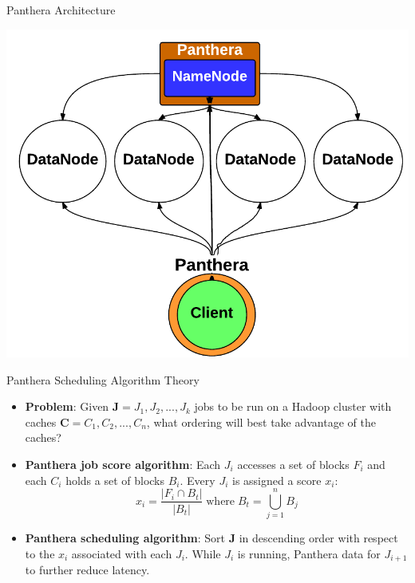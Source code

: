 \documentclass[final]{beamer} %
\begin{document}
\begin{frame}
\begin{columns}[t]
    \begin{column}{0.32\textwidth}
		\begin{block}{Panthera Architecture}
		\vspace{0.5em}
		\centerline{\includegraphics[scale=1.4]{assets/v2/panthera_hadoop_arch.pdf}}	  
	  \end{block}   	  

		\begin{block}{Panthera Scheduling Algorithm Theory}
		\begin{itemize}
			\item \textbf{Problem}: Given $\mathbf{J} = J_1, J_2, ... ,J_k$ jobs to be run
			on a Hadoop cluster with caches $\mathbf{C} = C_1, C_2, ..., C_n$, what ordering will best take advantage of the caches?
			\item \textbf{Panthera job score algorithm}: Each $J_i$ accesses a set of blocks $F_i$
			and each $C_i$ holds a set of blocks $B_i$.
			Every $J_i$ is assigned a score $x_i$:
			\begin{equation}
				x_i = \displaystyle{\frac{\left\vert{F_i \cap B_t}\right\vert}{ \left\vert{B_t}\right\vert}} \; \textrm{where} \;
				B_t = \bigcup_{j = 1}^{n} B_j
			\end{equation}
			\item \textbf{Panthera scheduling algorithm}:
			Sort $\mathbf{J}$ in descending order with respect to the $x_i$ associated
			with each $J_i$. While $J_i$ is running, Panthera data for $J_{i+1}$ to further reduce latency.
		\end{itemize}
		\end{block}
      

\end{column}
\end{columns}
\end{frame}
\end{document}
